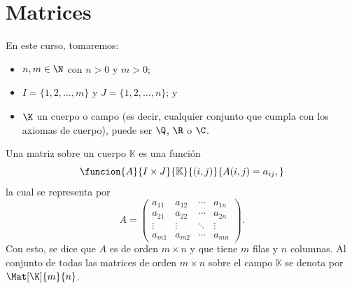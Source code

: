 \documentclass[a4,11pt]{aleph-notas}
\begin{document}
\encabezado


\tableofcontents

\section{Matrices}

En este curso, tomaremos:
\begin{itemize}
    \item
        $n,m\in \N$ con $n>0$ y $m>0$;
    \item 
        $I = \{ 1, 2, \ldots, m\}$ y $J =  \{1, 2 , \ldots, n \}$; y
    \item 
        $\K$ un cuerpo o campo (es decir, cualquier conjunto que cumpla con los axiomas de cuerpo), puede ser $\Q$, $\R$ o $\C$.
\end{itemize}

\begin{defi}[Matriz]
    Una matriz sobre un cuerpo $\mathbb{K}$ es una función 
    \[
        \funcion{A}{I\times J}{\mathbb{K}}
        {(i,j)}{A(i,j)=a_{ij},}
    \]
    la cual se representa por
    \[
        A = 
        \begin{pmatrix}
        a_{11} & a_{12} & \cdots & a_{1n} \\ 
        a_{21} & a_{22} & \cdots & a_{2n} \\ 
        \vdots & \vdots & \ddots & \vdots\\ 
        a_{m1} & a_{m2} & \cdots & a_{mn}
        \end{pmatrix}.
    \]
    Con esto, se dice que $A$ es de orden $m \times n$ y que tiene $m$ filas y $n$ columnas. Al conjunto de todas las matrices de orden $m \times n$ sobre el campo $\mathbb{K}$ se denota por $\Mat[\K]{m}{n}$.
\end{defi}




\end{document}
